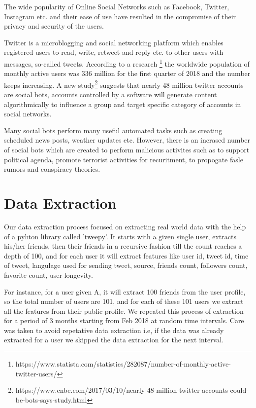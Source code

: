 \documentclass[conference]{IEEEtran}
\begin{document}
The wide popularity of Online Social Networks such as Facebook, Twitter, Instagram etc. and their ease of use have resulted in the compromise of their privacy and security of the users. 

Twitter is a microblogging and social networking  platform which enables registered users to read, write, retweet and reply etc. to other users with messages, so-called tweets.
According to a research \footnote{https://www.statista.com/statistics/282087/number-of-monthly-active-twitter-users/} the worldwide population of monthly active users was 336 million for the first quarter of 2018 and the number keeps increasing. A new study\footnote{https://www.cnbc.com/2017/03/10/nearly-48-million-twitter-accounts-could-be-bots-says-study.html} suggests 
that nearly 48 million twitter accounts are social bots, accounts controlled by a software will generate content algorithmically to influence a group and target specific category of accounts in social networks.

Many social bots perform many useful automated tasks such as creating scheduled news posts, weather updates etc. However, there is an incrased number of social bots which are created to perform malicious activites such as to support political agenda, promote terrorist activities for recuritment, to propogate fasle rumors and conspiracy theories. 

\section{Data Extraction}

Our data extraction process focused on extracting real world data with the help of a pyhton library called 'tweepy'. It starts with a given single user, extracts his/her friends, then their friends in a recursive fashion till the count reaches a depth of 100, and for each user it will extract features like user id, tweet id, time of tweet, langulage used for sending tweet, source, friends count, followers count, favorite count, user longevity.

For instance, for a user given A, it will extract 100 friends from the user profile, so the total number of users are 101, and for each of these 101 users we extract all the features from their public profile. We repeated this process of extraction for a period of 3 months starting from Feb 2018 at random time intervals. Care was taken to avoid repetative data extraction i.e, if the data was already extracted for a user we skipped the data extraction for the next interval.
\end{document}
